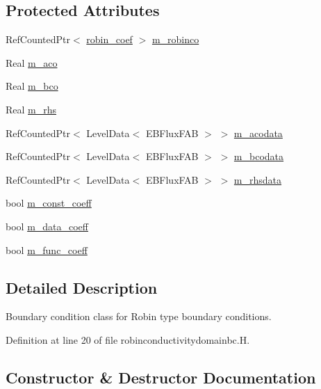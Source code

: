 \subsection*{Protected Attributes}
\begin{DoxyCompactItemize}
\item 
Ref\+Counted\+Ptr$<$ \hyperlink{classrobin__coef}{robin\+\_\+coef} $>$ \hyperlink{classrobinconductivitydomainbc_af035d7b5d25bbb12f006c7a21ff605e8}{m\+\_\+robinco}
\item 
Real \hyperlink{classrobinconductivitydomainbc_a84b1eb04c5234d8a40dc87a8abce1538}{m\+\_\+aco}
\item 
Real \hyperlink{classrobinconductivitydomainbc_af3d3ea2beabe95a46bef1f3cb2717eb6}{m\+\_\+bco}
\item 
Real \hyperlink{classrobinconductivitydomainbc_a28643b76a21e669ce19c2c4bd0a4a1e1}{m\+\_\+rhs}
\item 
Ref\+Counted\+Ptr$<$ Level\+Data$<$ E\+B\+Flux\+F\+AB $>$ $>$ \hyperlink{classrobinconductivitydomainbc_abcba1dd6b3ac37f9c0f32f5b460582db}{m\+\_\+acodata}
\item 
Ref\+Counted\+Ptr$<$ Level\+Data$<$ E\+B\+Flux\+F\+AB $>$ $>$ \hyperlink{classrobinconductivitydomainbc_a05ecbe71c79dd2e7c53f4a7983cd071a}{m\+\_\+bcodata}
\item 
Ref\+Counted\+Ptr$<$ Level\+Data$<$ E\+B\+Flux\+F\+AB $>$ $>$ \hyperlink{classrobinconductivitydomainbc_a103895237c51dd63c057f0c4ef3de846}{m\+\_\+rhsdata}
\item 
bool \hyperlink{classrobinconductivitydomainbc_a5800a5ac3674f33211a2057abf9592d2}{m\+\_\+const\+\_\+coeff}
\item 
bool \hyperlink{classrobinconductivitydomainbc_ac6b528516a7c13965c06fb332f8836dd}{m\+\_\+data\+\_\+coeff}
\item 
bool \hyperlink{classrobinconductivitydomainbc_a7f219d0cd6ec97a2e4ba06d9cf414049}{m\+\_\+func\+\_\+coeff}
\end{DoxyCompactItemize}


\subsection{Detailed Description}
Boundary condition class for Robin type boundary conditions. 

Definition at line 20 of file robinconductivitydomainbc.\+H.



\subsection{Constructor \& Destructor Documentation}
